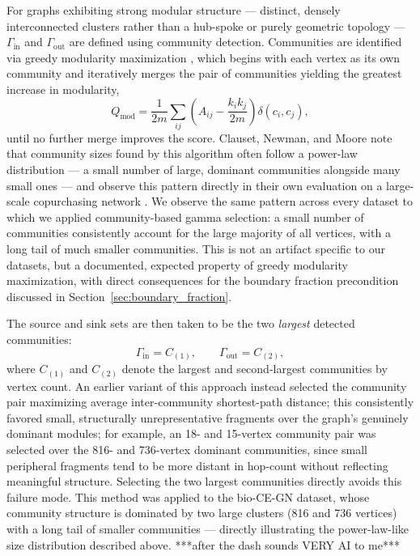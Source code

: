 \documentclass[a4paper,12pt]{amsart}
\numberwithin{equation}{section}
\begin{document}
For graphs exhibiting strong modular structure — distinct, densely 
interconnected clusters rather than a hub-spoke or purely geometric 
topology — $\Gamma_{\text{in}}$ and $\Gamma_{\text{out}}$ are defined 
using community detection. Communities are identified via greedy 
modularity maximization \citep{clauset2004finding}, which begins with 
each vertex as its own community and iteratively merges the pair of 
communities yielding the greatest increase in modularity,
\begin{equation}
Q_{\text{mod}} = \frac{1}{2m}\sum_{ij}\left(A_{ij} - \frac{k_i k_j}{2m}\right)\delta(c_i, c_j),
\end{equation}
until no further merge improves the score. Clauset, Newman, and Moore 
note that community sizes found by this algorithm often follow a 
power-law distribution — a small number of large, dominant communities 
alongside many small ones — and observe this pattern directly in their 
own evaluation on a large-scale copurchasing network 
\citep{clauset2004finding}. We observe the same pattern across every 
dataset to which we applied community-based gamma selection: a small 
number of communities consistently account for the large majority of 
all vertices, with a long tail of much smaller communities. This is 
not an artifact specific to our datasets, but a documented, expected 
property of greedy modularity maximization, with direct consequences 
for the boundary fraction precondition discussed in 
Section~\ref{sec:boundary_fraction}.

The source and sink sets are then taken to be the two \emph{largest} 
detected communities:
\begin{equation}
\Gamma_{\text{in}} = C_{(1)}, \qquad \Gamma_{\text{out}} = C_{(2)},
\end{equation}
where $C_{(1)}$ and $C_{(2)}$ denote the largest and second-largest 
communities by vertex count. An earlier variant of this approach 
instead selected the community pair maximizing average inter-community 
shortest-path distance; this consistently favored small, structurally 
unrepresentative fragments over the graph's genuinely dominant modules; 
for example, an 18- and 15-vertex community pair was selected over the 
816- and 736-vertex dominant communities, since small peripheral 
fragments tend to be more distant in hop-count without reflecting 
meaningful structure. Selecting the two largest communities directly 
avoids this failure mode. This method was applied to the bio-CE-GN 
dataset, whose community structure is dominated by two large clusters 
(816 and 736 vertices) with a long tail of smaller communities — 
directly illustrating the power-law-like size distribution described 
above. ***after the dash sounds VERY AI to me***
\end{document}
